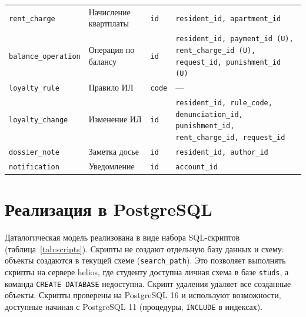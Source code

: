 \documentclass[12pt,a4paper]{article}
\begin{document}
\begin{longtable}{L{30.5mm} L{33.3mm} L{34.3mm} L{54.3mm}}
\texttt{rent\_\allowbreak{}charge} & Начисление квартплаты & \texttt{id} & \texttt{resident\_\allowbreak{}id, apartment\_\allowbreak{}id} \\
\texttt{balance\_\allowbreak{}operation} & Операция по балансу & \texttt{id} & \texttt{resident\_\allowbreak{}id, payment\_\allowbreak{}id (U), rent\_\allowbreak{}charge\_\allowbreak{}id (U), request\_\allowbreak{}id, punishment\_\allowbreak{}id (U)} \\
\texttt{loyalty\_\allowbreak{}rule} & Правило ИЛ & \texttt{code} & — \\
\texttt{loyalty\_\allowbreak{}change} & Изменение ИЛ & \texttt{id} & \texttt{resident\_\allowbreak{}id, rule\_\allowbreak{}code, denunciation\_\allowbreak{}id, punishment\_\allowbreak{}id, rent\_\allowbreak{}charge\_\allowbreak{}id, request\_\allowbreak{}id} \\
\texttt{dossier\_\allowbreak{}note} & Заметка досье & \texttt{id} & \texttt{resident\_\allowbreak{}id, author\_\allowbreak{}id} \\
\texttt{notification} & Уведомление & \texttt{id} & \texttt{account\_\allowbreak{}id} \\
\end{longtable}
\section{Реализация в PostgreSQL}\label{sec:impl}

Даталогическая модель реализована в виде набора SQL-скриптов (таблица~\ref{tab:scripts}).
Скрипты не создают отдельную базу данных и схему: объекты создаются в текущей схеме
(\texttt{search\_\allowbreak{}path}). Это позволяет выполнять скрипты на сервере helios, где студенту
доступна личная схема в базе \texttt{studs}, а команда \texttt{CREATE DATABASE} недоступна.
Скрипт удаления удаляет все созданные объекты. Скрипты проверены на PostgreSQL 16 и используют
возможности, доступные начиная с PostgreSQL 11 (процедуры, \texttt{INCLUDE} в индексах).
\end{document}
